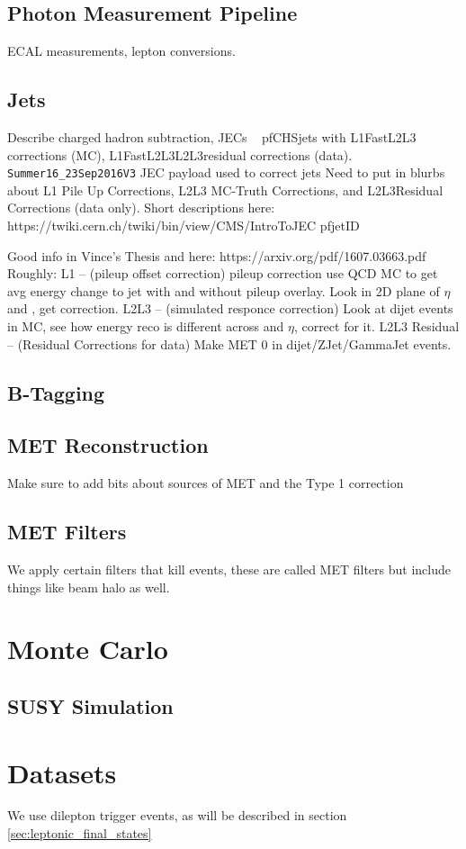  \subsection{Photon Measurement Pipeline}
    ECAL measurements, lepton conversions.
  \subsection{Jets} \label{sec:jets}
    Describe charged hadron subtraction, JECs ~\cite{JERC}
    pfCHSjets with L1FastL2L3 corrections (MC), L1FastL2L3L2L3residual corrections (data).
    \verb=Summer16_23Sep2016V3= JEC payload used to correct jets
    Need to put in blurbs about L1 Pile Up Corrections, L2L3 MC-Truth Corrections, and L2L3Residual Corrections (data only). Short descriptions here: https://twiki.cern.ch/twiki/bin/view/CMS/IntroToJEC
    pfjetID


    Good info in Vince's Thesis and here: https://arxiv.org/pdf/1607.03663.pdf
    Roughly: L1 -- (pileup offset correction) pileup correction use QCD MC to get avg energy change to jet with and without pileup overlay. Look in 2D plane of $\eta$ and \pt, get correction.
    L2L3 -- (simulated responce correction) Look at dijet events in MC, see how energy reco is different across \pt and $\eta$, correct for it.
    L2L3 Residual -- (Residual Corrections for data) Make MET 0 in dijet/ZJet/GammaJet events.
  \subsection{B-Tagging} \label{sec:b-tagging}

  \subsection{MET Reconstruction} \label{sec:MET_reco}
    Make sure to add bits about sources of MET and the Type 1 correction
  \subsection{MET Filters} \label{sec:met_filters} 
    We apply certain filters that kill events, these are called MET filters but include things like beam halo as well.

\section{Monte Carlo}
  \subsection{SUSY Simulation} \label{sec:susy_simulation}

\section{Datasets} \label{sec:datasets}
We use dilepton trigger events, as will be described in section \ref{sec:leptonic_final_states}
